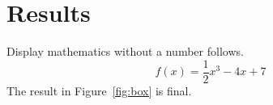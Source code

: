\section{Results}\label{sec:results}

Display mathematics without a number follows.
\[
  f(x) = \frac{1}{2} x^3 - 4x + 7
\]
The result in Figure~\ref{fig:box} is final.
